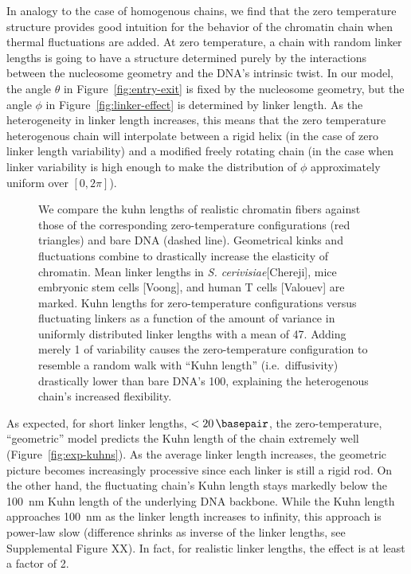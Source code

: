 \documentclass[%
 reprint,
superscriptaddress,
showpacs,preprintnumbers,
 amsmath,amssymb,
 aps,
 prl,
]{revtex4-1}
\begin{document}
In analogy to the case of homogenous chains, we find that the zero temperature
    structure provides good intuition for the behavior of the chromatin chain
    when thermal fluctuations are added.
At zero temperature, a chain with random linker lengths is going to have a
    structure determined purely by the interactions between the nucleosome geometry
    and the DNA's intrinsic twist.
In our model, the angle $\theta$ in Figure~\ref{fig:entry-exit} is fixed by the
    nucleosome geometry, but the angle $\phi$ in Figure~\ref{fig:linker-effect}
    is determined by linker length.
As the heterogeneity in linker length increases, this means that the
    zero temperature heterogenous chain will interpolate between a rigid helix
    (in the case of zero linker length variability) and a modified freely
    rotating chain (in the case when linker variability is high enough to make
    the distribution of $\phi$ approximately uniform over $[0, 2\pi]$).

\begin{figure}[t]
    \centering
    \caption{\protect{} We compare the kuhn lengths of realistic chromatin fibers
    against those of the corresponding zero-temperature configurations (red
    triangles) and bare DNA (dashed line). Geometrical kinks and fluctuations
    combine to drastically increase the elasticity of chromatin. Mean linker
    lengths in \textit{S.  cerivisiae}[Chereji], mice embryonic stem cells
    [Voong], and human T cells  [Valouev] are marked.
    \protect{} Kuhn lengths for
    zero-temperature configurations versus fluctuating linkers as a function of
    the amount of variance in uniformly distributed linker lengths with a mean
    of \SI{47}{\basepair}. Adding merely \SI{1}{\basepair} of variability causes the
    zero-temperature configuration to resemble a random walk with ``Kuhn
    length'' (i.e.\ diffusivity) drastically lower than bare DNA's
    \SI{100}{\basepair}, explaining the heterogenous chain's increased
    flexibility.}%
\end{figure}

As expected, for short linker lengths, $<\SI{20}{\basepair}$, the
    zero-temperature, ``geometric'' model predicts the Kuhn length of the chain
    extremely well (Figure~\ref{fig:exp-kuhns}).
As the average linker length
    increases, the geometric picture becomes increasingly processive since each
    linker is still a rigid rod.
On the other hand, the fluctuating chain's Kuhn length stays markedly below the
    \SI{100}{\nano\metre} Kuhn length of the underlying DNA backbone.
While the Kuhn length approaches \SI{100}{\nano\metre} as the linker length
    increases to infinity, this approach is power-law slow (difference shrinks
    as inverse of the linker lengths, see Supplemental Figure XX).
In fact, for realistic linker lengths, the effect is at least a factor of 2.
\end{document}
